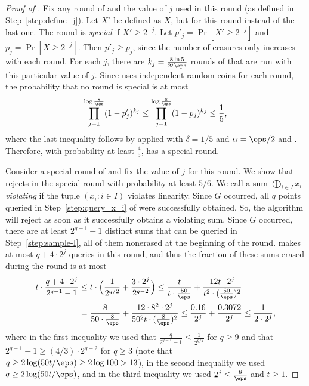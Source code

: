 \documentclass{toc}
\begin{document}
\begin{proof}[Proof of ]
Fix any round of  and the value of $j$ used in this round (as defined in Step~\ref{step:define_j}). Let $X'$ be defined as $X$, but for this round instead of the last one.
The round is \emph{special} if $X' \geq 2^{-j}$. Let $p'_j = \Pr[X' \geq 2^{-j}]$ and $p_j = \Pr[X\geq 2^{-j}]$. 
Then  $p'_j\geq p_j$, since the number of erasures only increases with each round. For each $j$, there are $k_j = \frac{8 \ln 5}{2^j \eps}$ rounds of  that are run with this particular value of $j$. Since  uses independent random coins for each round, the probability that no round is special is at most
\begin{equation*}
    \prod_{j=1}^{\log \frac{8}{\eps}}(1-p'_j)^{k_j} \leq \prod_{j=1}^{\log \frac{8}{\eps}}(1-p_j)^{k_j} \leq \frac{1}{5},
\end{equation*}
where the last inequality follows by  applied with $\delta=1/5$ and $\alpha=\eps/2$ and . Therefore, with probability at least $\frac{4}{5}$,  has a special round. 



Consider a special round of  and fix the value of $j$ for this round. We show that  rejects in the special round 
with probability at least $5/6$. We call a sum $\bigoplus_{i\in I}x_i$ {\em violating} if the tuple $(x_i \colon i \in I)$ violates linearity. Since $G$ occurred, all $q$ points queried in Step~\ref{step:query_x_i} of  were successfully obtained. So, the algorithm will reject as soon as it successfully obtains a violating sum. Since $G$ occurred, there are at least $2^{q-1}-1$ distinct sums that can be queried in Step~\ref{step:sample-I}, all of them nonerased at the beginning of the round.  makes at most $q + 4\cdot 2^j$ queries in this round, and thus the fraction of these sums erased during the round is at most
\begin{align*}
    t\cdot\frac{q + 4\cdot 2^j}{2^{q-1}-1}
   &\leq  t\cdot \Big(\frac{1}{2^{q/2}} + \frac{3\cdot 2^j}{2^{q-2}} \Big)
   \leq 
  \frac{t}{t \cdot \frac{50}{\eps}} + \frac{12t \cdot 2^j}{t^2 \cdot (\frac{50}{\eps})^2} \\
   &=   \frac{8}{50 \cdot \frac{8}{\eps}} + \frac{12 \cdot 8^2\cdot 2^j}{50^2t \cdot (\frac{8}{\eps})^2} 
   \leq 
 \frac{0.16}{2^j} + \frac{0.3072}{ 2^j} 
      \leq 
     \frac{1}{2 \cdot 2^j},
\end{align*}
where in the first inequality we used that $\frac{q}{2^{q-1}-1} \leq \frac{1}{2^{q/2}}$  for $q \geq 9$ and that $2^{q-1}-1\geq (4/3)\cdot 2^{q-2}$ for $q\geq 3$ (note that $q \geq 2\log(50t/\eps)\geq 2\log 100>13$), in the second inequality we used $q \geq 2\log(50t/\eps)$, and in the third inequality we used $2^j \leq \frac{8}{\eps}$ and $t\geq 1$. 


\end{proof}
\end{document}
